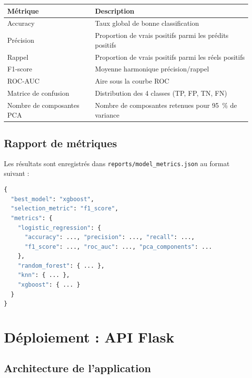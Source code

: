 \documentclass[11pt,a4paper]{article}
\begin{document}
\begin{center}
\begin{tabular}{L{4.5cm} L{8cm}}
\toprule
\textbf{Métrique} & \textbf{Description} \\
\midrule
Accuracy & Taux global de bonne classification \\
Précision & Proportion de vrais positifs parmi les prédits positifs \\
Rappel & Proportion de vrais positifs parmi les réels positifs \\
F1-score & Moyenne harmonique précision/rappel \\
ROC-AUC & Aire sous la courbe ROC \\
Matrice de confusion & Distribution des 4 classes (TP, FP, TN, FN) \\
Nombre de composantes PCA & Nombre de composantes retenues pour 95~\% de variance \\
\bottomrule
\end{tabular}
\end{center}

\subsection{Rapport de métriques}

Les résultats sont enregistrés dans \texttt{reports/model\_metrics.json} au format suivant :

\begin{lstlisting}[language=Python, caption=Structure du rapport de métriques]
{
  "best_model": "xgboost",
  "selection_metric": "f1_score",
  "metrics": {
    "logistic_regression": {
      "accuracy": ..., "precision": ..., "recall": ...,
      "f1_score": ..., "roc_auc": ..., "pca_components": ...
    },
    "random_forest": { ... },
    "knn": { ... },
    "xgboost": { ... }
  }
}
\end{lstlisting}

\section{Déploiement : API Flask}

\subsection{Architecture de l'application}
\end{document}
